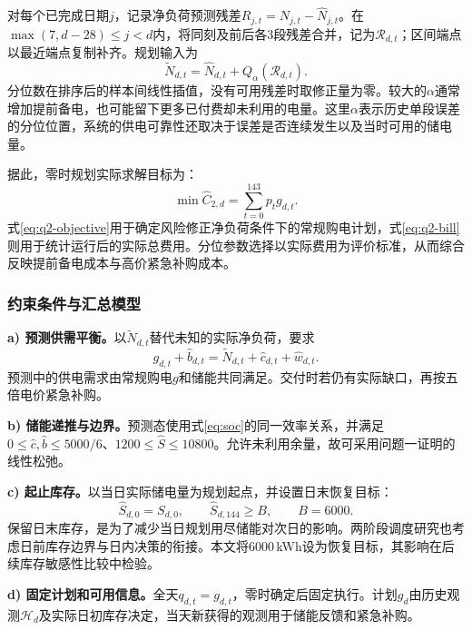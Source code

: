 对每个已完成日期$j$，记录净负荷预测残差$R_{j,t}=N_{j,t}-\widehat N_{j,t}$。在$\max(7,d-28)\le j<d$内，将同刻及前后各3段残差合并，记为$\mathcal R_{d,t}$；区间端点以最近端点复制补齐。规划输入为
\begin{equation}
 \widetilde N_{d,t}=\widehat N_{d,t}+Q_{\alpha}(\mathcal R_{d,t}).\label{eq:risk}
\end{equation}
分位数在排序后的样本间线性插值，没有可用残差时取修正量为零。较大的$\alpha$通常增加提前备电，也可能留下更多已付费却未利用的电量。这里$\alpha$表示历史单段误差的分位位置，系统的供电可靠性还取决于误差是否连续发生以及当时可用的储电量。

据此，零时规划实际求解目标为：
\begin{equation}
 \min \widehat C_{2,d}=\sum_{t=0}^{143}p_tg_{d,t}.\label{eq:q2-objective}
\end{equation}
式\eqref{eq:q2-objective}用于确定风险修正净负荷条件下的常规购电计划，式\eqref{eq:q2-bill}则用于统计运行后的实际总费用。分位参数选择以实际费用为评价标准，从而综合反映提前备电成本与高价紧急补购成本。

\subsubsection{约束条件与汇总模型}
\textbf{a) 预测供需平衡。}以$\widetilde N_{d,t}$替代未知的实际净负荷，要求
\begin{equation}
 g_{d,t}+\widehat b_{d,t}=\widetilde N_{d,t}+\widehat c_{d,t}+\widehat w_{d,t}.
\end{equation}
预测中的供电需求由常规购电$g$和储能共同满足。交付时若仍有实际缺口，再按五倍电价紧急补购。

\textbf{b) 储能递推与边界。}预测态使用式\eqref{eq:soc}的同一效率关系，并满足$0\le\widehat c,\widehat b\le5000/6$、$1200\le\widehat S\le10800$。允许未利用余量，故可采用问题一证明的线性松弛。

\textbf{c) 起止库存。}以当日实际储电量为规划起点，并设置日末恢复目标：
\begin{equation}
 \widehat S_{d,0}=S_{d,0},\qquad \widehat S_{d,144}\ge B,\qquad B=6000.
\end{equation}
保留日末库存，是为了减少当日规划用尽储能对次日的影响。两阶段调度研究也考虑日前库存边界与日内决策的衔接。本文将6000\,kWh设为恢复目标，其影响在后续库存敏感性比较中检验。

\textbf{d) 固定计划和可用信息。}全天$q_{d,t}=g_{d,t}$，零时确定后固定执行。计划$g_d$由历史观测$\mathcal H_d$及实际日初库存决定，当天新获得的观测用于储能反馈和紧急补购。

